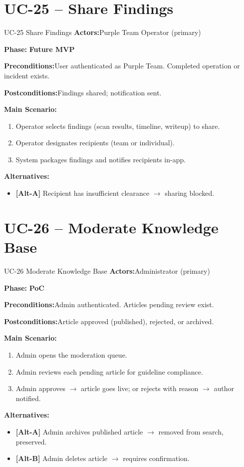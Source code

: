 \documentclass[12pt,a4paper]{report}
\newcommand{\ucfield}[2]{%
    \noindent\textbf{\color{helixpurplemid}#1:}\quad #2\par\medskip
}
\newcommand{\ucphase}[1]{%
    \noindent\textbf{\color{helixpurplemid}Phase:}\quad%
    \ifstrequal{#1}{PoC}{\textcolor{helixteal}{\textbf{PoC}}}{\textcolor{helixamber}{\textbf{Future MVP}}}%
    \par\medskip
}
\begin{document}
\section{UC-25 -- Share Findings}
\begin{ucbox}{UC-25 \quad Share Findings}
    \ucfield{Actors}{Purple Team Operator (primary)}
    \ucphase{Future MVP}
    \ucfield{Preconditions}{User authenticated as Purple Team. Completed operation or incident exists.}
    \ucfield{Postconditions}{Findings shared; notification sent.}
    \textbf{\color{helixpurplemid}Main Scenario:}
    \begin{enumerate}
        \item Operator selects findings (scan results, timeline, writeup) to share.
        \item Operator designates recipients (team or individual).
        \item System packages findings and notifies recipients in-app.
    \end{enumerate}
    \textbf{\color{helixpurplemid}Alternatives:}
    \begin{itemize}
        \item \textbf{[Alt-A]} Recipient has insufficient clearance $\rightarrow$ sharing blocked.
    \end{itemize}
\end{ucbox}

\section{UC-26 -- Moderate Knowledge Base}
\begin{ucbox}{UC-26 \quad Moderate Knowledge Base}
    \ucfield{Actors}{Administrator (primary)}
    \ucphase{PoC}
    \ucfield{Preconditions}{Admin authenticated. Articles pending review exist.}
    \ucfield{Postconditions}{Article approved (published), rejected, or archived.}
    \textbf{\color{helixpurplemid}Main Scenario:}
    \begin{enumerate}
        \item Admin opens the moderation queue.
        \item Admin reviews each pending article for guideline compliance.
        \item Admin approves $\rightarrow$ article goes live; or rejects with reason $\rightarrow$ author notified.
    \end{enumerate}
    \textbf{\color{helixpurplemid}Alternatives:}
    \begin{itemize}
        \item \textbf{[Alt-A]} Admin archives published article $\rightarrow$ removed from search, preserved.
        \item \textbf{[Alt-B]} Admin deletes article $\rightarrow$ requires confirmation.
    \end{itemize}
\end{ucbox}
\end{document}

